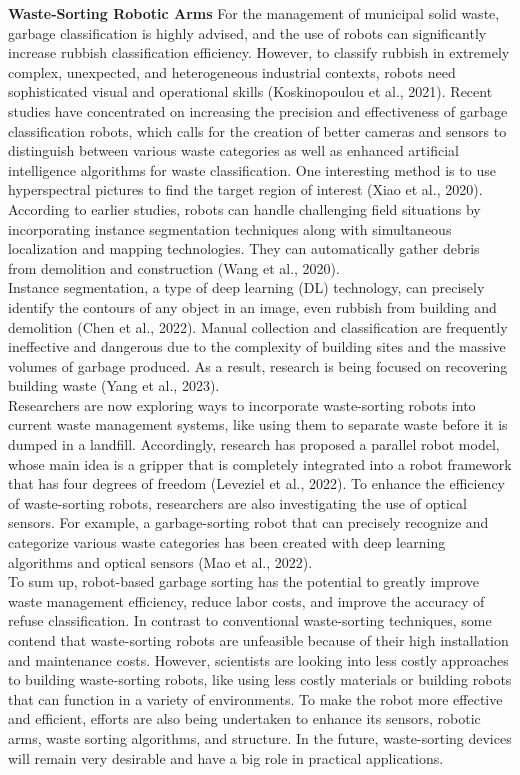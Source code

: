 \documentclass[a4paper,11pt,onecolumn]{article}
\begin{document}
\textbf{Waste‑Sorting Robotic Arms} For the management of municipal solid waste, garbage classification is highly advised, and the use of robots can significantly increase rubbish classification efficiency. However, to classify rubbish in extremely complex, unexpected, and heterogeneous industrial contexts, robots need sophisticated visual and operational skills (Koskinopoulou et al., 2021). Recent studies have concentrated on increasing the precision and effectiveness of garbage classification robots, which calls for the creation of better cameras and sensors to distinguish between various waste categories as well as enhanced artificial intelligence algorithms for waste classification. One interesting method is to use hyperspectral pictures to find the target region of interest (Xiao et al., 2020). According to earlier studies, robots can handle challenging field situations by incorporating instance segmentation techniques along with simultaneous localization and mapping technologies. They can automatically gather debris from demolition and construction (Wang et al., 2020). \\
Instance segmentation, a type of deep learning (DL) technology, can precisely identify the contours of any object in an image, even rubbish from building and demolition (Chen et al., 2022). Manual collection and classification are frequently ineffective and dangerous due to the complexity of building sites and the massive volumes of garbage produced. As a result, research is being focused on recovering building waste (Yang et al., 2023).\\
Researchers are now exploring ways to incorporate waste-sorting robots into current waste management systems, like using them to separate waste before it is dumped in a landfill. Accordingly, research has proposed a parallel robot model, whose main idea is a gripper that is completely integrated into a robot framework that has four degrees of freedom (Leveziel et al., 2022). To enhance the efficiency of waste-sorting robots, researchers are also investigating the use of optical sensors. For example, a garbage-sorting robot that can precisely recognize and categorize various waste categories has been created with deep learning algorithms and optical sensors (Mao et al., 2022).\\To sum up, robot-based garbage sorting has the potential to greatly improve waste management efficiency, reduce labor costs, and improve the accuracy of refuse classification. In contrast to conventional waste-sorting techniques, some contend that waste-sorting robots are unfeasible because of their high installation and maintenance costs. However, scientists are looking into less costly approaches to building waste-sorting robots, like using less costly materials or building robots that can function in a variety of environments. To make the robot more effective and efficient, efforts are also being undertaken to enhance its sensors, robotic arms, waste sorting algorithms, and structure. In the future, waste-sorting devices will remain very desirable and have a big role in practical applications.\newline \\
\end{document}
